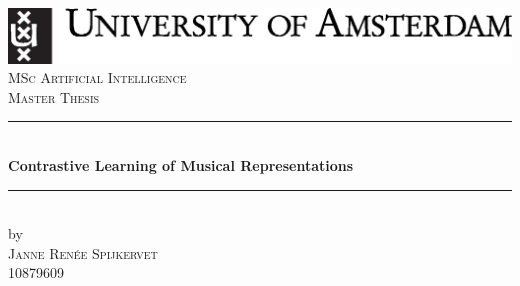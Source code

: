 \begin{titlepage}
    \begin{fullwidth}
        \newcommand{\HRule}{\rule{\linewidth}{0.5mm}} %
        \center %
        
        
        \includegraphics[width=\linewidth]{images/uvalogo_regular_p_en.eps}\\[2.5cm]
        \textsc{\Large MSc Artificial Intelligence}\\[0.2cm]
        \textsc{\Large Master Thesis}\\[0.5cm] 
        
        
        \HRule \\[0.4cm]
        { \huge \bfseries Contrastive Learning of Musical Representations}\\[0.4cm] %
        \HRule \\[0.5cm]
        
        
        by\\[0.2cm]
        \textsc{\Large Janne Renée Spijkervet}\\[0.2cm] %
        10879609\\[1cm]
        
        
        

\end{fullwidth}
\end{titlepage}
